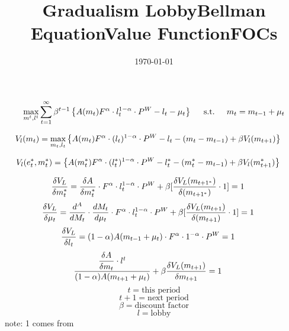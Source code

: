 \documentclass[12pt]{article}
\begin{document}
\title{\vskip-0.6in Gradualism
}
\date{\today}
\maketitle

\title{Lobby}
\[
\max_{m^t,l^t} \sum_{t=1}^\infty \beta^{t-1}\left\{A(m_t)F^\alpha\cdot l^{1-\alpha}_t\cdot P^W-l_t-\mu_t
  \right\} \hskip.2in \text{s.t.} \hskip.2in  m_t=m_{t-1}+\mu_t
\]

 
\title{Bellman Equation}
\[
  V_l(m_t)=\max_{m_t,l_t}\left\{A(m_t)F^\alpha\cdot (l_t)^{1-\alpha}\cdot P^W-l_t-(m_t-m_{t-1})+\beta V_l(m_{t+1})
  \right\} \hskip.2in 
\]
\title{Value Function}
\[
  V_l(e_t^\ast,m_t^\ast)=\left\{A(m_t^\ast)F^\alpha\cdot (l^\ast_t)^{1-\alpha}\cdot P^W-l_t^\ast-(m^\ast_t-m_{t-1})+\beta V_l(m^\ast_{t+1})
  \right\} \hskip.2in
\]
\title{FOCs}
\[\dfrac{\delta V_L}{\delta m_t^\ast}=\dfrac{\delta A}{\delta m^\ast_t} \cdot F^\alpha \cdot l^{1-\alpha}_t \cdot P^W +\beta [\dfrac{\delta V_L(m_{t+1^\ast})}{\delta(m_{t+1^\ast})} \cdot 1] =1
\hskip.2in
\]
\[
\dfrac{\delta V_L}{\delta \mu_t}=\dfrac{d^A}{dM_t} \cdot \dfrac{dM_t}{d\mu_t} \cdot F^\alpha \cdot l_t^{1-\alpha} \cdot P^W + \beta[\dfrac{\delta V_L(m_{t+1})}{\delta(m_{t+1})} \cdot 1] =1
\hskip.2in 
\]
\[
\dfrac{\delta V_L}{\delta l_t}= (1-\alpha) A(m_{t-1}+\mu_t) \cdot F^\alpha \cdot 1^{-\alpha} \cdot P^W =1
\hskip.2in 
\]
\[
\dfrac{\dfrac{\delta A}{\delta m_t} \cdot l^t}{(1-\alpha) A(m_{t+1}+\mu_t)} +\beta \dfrac{\delta V_L (m_{t+1})}{\delta m_{t+1}} =1
\hskip.2in
\]
\[
t=\text{this period}
\]
\[
t+1=\text{next period}
\]
\[
\beta=\text{discount factor}
\]
\[
l=\text{lobby}
\]
note: 1 comes from 
\end{document}
